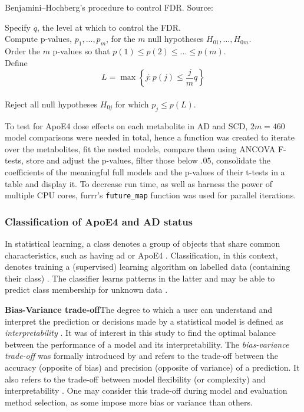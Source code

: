 \documentclass{amsart}
\begin{document}
\begin{algorithm}
\caption{Benjamini–Hochberg's procedure to control FDR. Source: \cite{James2023AnEdition}}\label{alg:fdr}
Specify $q$, the level at which to control the FDR.\\
Compute p-values, $p_1, ... , p_m$, for the $m$ null hypotheses $H_{01},...,H_{0m}$. \\
Order the $m$ p-values so that $p(1) \leq p(2) \leq ... \leq p(m)$.\\
Define
\[L = \max\left\{j : p(j) \leq \frac{j}{m}q \right\}\] \\
Reject all null hypotheses $H_{0j}$ for which $p_j \leq p(L)$.
\end{algorithm}

To test for ApoE4 dose effects on each metabolite in AD and SCD, $2m=460$ model comparisons were needed in total, hence a function was created to iterate over the metabolites, fit the nested models, compare them using ANCOVA F-tests, store and adjust the p-values, filter those below .05, consolidate the coefficients of the meaningful full models and the p-values of their t-tests in a table and display it. To decrease run time, as well as harness the power of multiple CPU cores, \textsf{furrr}'s \texttt{future\_map} function was used for parallel iterations.

\newpage \subsubsection{Classification of ApoE4 and AD status}\label{rq2}
In statistical learning, a class denotes a group of objects that share common characteristics, such as having \acrshort{ad} or ApoE4 \cite*{Drummond2010}. Classification, in this context, denotes training a (supervised) learning algorithm on labelled data (containing their class) \cite*{Drummond2010}. The classifier learns patterns in the latter and may be able to predict class membership for unknown data \cite*{Drummond2010}.

\leavevmode\newline \textbf{Bias-Variance trade-off}\hspace{.25cm}The degree to which a user can understand and interpret the prediction or decisions made by a statistical model is defined as \textit{interpretability} \cite{Elshawi2019OnHypertension}. It was of interest in this study to find the optimal balance between the performance of a model and its interpretability. The \textit{bias-variance trade-off} was formally introduced by \citeauthor{Geman1992NeuralDilemma} and refers to the trade-off between the accuracy (opposite of bias) and precision (opposite of variance) of a prediction. It also refers to the trade-off between model flexibility (or complexity) and interpretability \cite{Geman1992NeuralDilemma}. One may consider this trade-off during model and evaluation method selection, as some impose more bias or variance than others.
\end{document}
